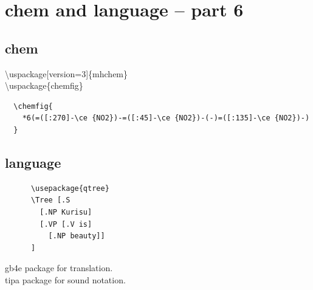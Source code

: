 \documentclass[11pt,a4paper]{article}
\begin{document}
\section{chem and language -- part 6}{
  \subsection{chem}{
    \textbackslash{}uspackage[version=3]\{mhchem\} \\
    \textbackslash{}uspackage\{chemfig\} \\    
                  {
\begin{verbatim}
  \chemfig{
    *6(=([:270]-\ce {NO2})-=([:45]-\ce {NO2})-(-)=([:135]-\ce {NO2})-)
  }
\end{verbatim}
                  }
  }
  
  \subsection{language}{
    {
\begin{verbatim}
      \usepackage{qtree}
      \Tree [.S
        [.NP Kurisu]
        [.VP [.V is]
          [.NP beauty]]
      ]
\end{verbatim}
    }
    gb4e package for translation. \\
    tipa package for sound notation.
  }
}
\end{document}
